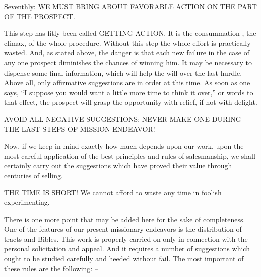 \documentclass[
]{book}
\begin{document}
Seventhly: WE MUST BRING ABOUT FAVORABLE ACTION ON THE PART OF THE PROSPECT.

This step has fitly been called GETTING ACTION. It is the consummation , the climax, of the whole procedure. Without this step the whole effort is practically wasted. And, as stated above, the danger is that each new failure in the case of any one prospect diminishes the chances of winning him. It may be necessary to dispense some final information, which will help the will over the last hurdle. Above all, only affirmative suggestions are in order at this time. As soon as one says, ``I suppose you would want a little more time to think it over,'' or words to that effect, the prospect will grasp the opportunity with relief, if not with delight.

AVOID ALL NEGATIVE SUGGESTIONS; NEVER MAKE ONE DURING THE LAST STEPS OF MISSION ENDEAVOR!

Now, if we keep in mind exactly how much depends upon our work, upon the most careful application of the best principles and rules of salesmanship, we shall certainly carry out the suggestions which have proved their value through centuries of selling.

THE TIME IS SHORT! We cannot afford to waste any time in foolish experimenting.

There is one more point that may be added here for the sake of completeness. One of the features of our present missionary endeavors is the distribution of tracts and Bibles. This work is properly carried on only in connection with the personal solicitation and appeal. And it requires a number of suggestions which ought to be studied carefully and heeded without fail. The most important of these rules are the following: --
\end{document}
